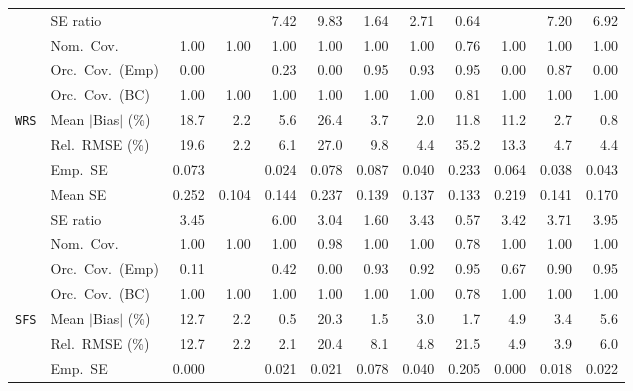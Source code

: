 \begin{landscape}
\begin{longtable}{llrrrrrrrrrr}
 & SE ratio &  &  & 7.42 & 9.83 & \cellcolor{ranktwo}1.64 & \cellcolor{rankthree}2.71 & \cellcolor{rankone}0.64 &  & 7.20 & 6.92 \\
 & Nom.\ Cov. & \cellcolor{ranktwo}1.00 & \cellcolor{rankthree}1.00 & 1.00 & 1.00 & \cellcolor{rankone}1.00 & 1.00 & 0.76 & 1.00 & 1.00 & 1.00 \\
 & Orc.\ Cov.\ (Emp) & 0.00 &  & 0.23 & 0.00 & \cellcolor{rankone}0.95 & \cellcolor{rankthree}0.93 & \cellcolor{ranktwo}0.95 & 0.00 & 0.87 & 0.00 \\
 & Orc.\ Cov.\ (BC) & \cellcolor{ranktwo}1.00 & \cellcolor{rankthree}1.00 & 1.00 & 1.00 & \cellcolor{rankone}1.00 & 1.00 & 0.81 & 1.00 & 1.00 & 1.00 \\
\addlinespace[2pt]
\quad \texttt{WRS} & Mean $|$Bias$|$ (\%) & 18.7 & \cellcolor{rankthree}2.2 & 5.6 & 26.4 & 3.7 & \cellcolor{ranktwo}2.0 & 11.8 & 11.2 & 2.7 & \cellcolor{rankone}0.8 \\
 & Rel.\ RMSE (\%) & 19.6 & \cellcolor{rankone}2.2 & 6.1 & 27.0 & 9.8 & \cellcolor{rankthree}4.4 & 35.2 & 13.3 & 4.7 & \cellcolor{ranktwo}4.4 \\
 & Emp.\ SE & 0.073 &  & 0.024 & 0.078 & 0.087 & 0.040 & 0.233 & 0.064 & 0.038 & 0.043 \\
 & Mean SE & 0.252 & 0.104 & 0.144 & 0.237 & 0.139 & 0.137 & 0.133 & 0.219 & 0.141 & 0.170 \\
 & SE ratio & 3.45 &  & 6.00 & \cellcolor{rankthree}3.04 & \cellcolor{ranktwo}1.60 & 3.43 & \cellcolor{rankone}0.57 & 3.42 & 3.71 & 3.95 \\
 & Nom.\ Cov. & \cellcolor{ranktwo}1.00 & \cellcolor{rankthree}1.00 & 1.00 & \cellcolor{rankone}0.98 & 1.00 & 1.00 & 0.78 & 1.00 & 1.00 & 1.00 \\
 & Orc.\ Cov.\ (Emp) & 0.11 &  & 0.42 & 0.00 & \cellcolor{rankthree}0.93 & 0.92 & \cellcolor{rankone}0.95 & 0.67 & 0.90 & \cellcolor{ranktwo}0.95 \\
 & Orc.\ Cov.\ (BC) & \cellcolor{rankone}1.00 & \cellcolor{ranktwo}1.00 & \cellcolor{rankthree}1.00 & 1.00 & 1.00 & 1.00 & 0.78 & 1.00 & 1.00 & 1.00 \\
\addlinespace[2pt]
\quad \texttt{SFS} & Mean $|$Bias$|$ (\%) & 12.7 & 2.2 & \cellcolor{rankone}0.5 & 20.3 & \cellcolor{ranktwo}1.5 & 3.0 & \cellcolor{rankthree}1.7 & 4.9 & 3.4 & 5.6 \\
 & Rel.\ RMSE (\%) & 12.7 & \cellcolor{ranktwo}2.2 & \cellcolor{rankone}2.1 & 20.4 & 8.1 & 4.8 & 21.5 & 4.9 & \cellcolor{rankthree}3.9 & 6.0 \\
 & Emp.\ SE & 0.000 &  & 0.021 & 0.021 & 0.078 & 0.040 & 0.205 & 0.000 & 0.018 & 0.022 \\

\end{longtable}
\end{landscape}
